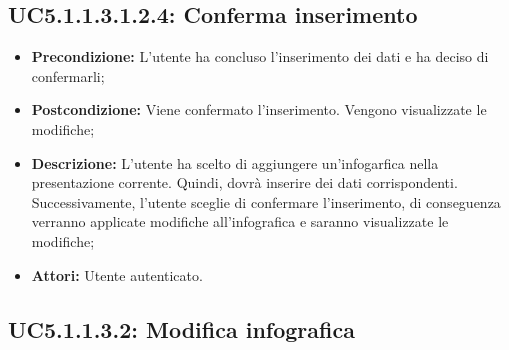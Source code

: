 \subsection{ UC5.1.1.3.1.2.4: Conferma inserimento}

\begin{itemize}
	\item \textbf{Precondizione:} L'utente ha concluso l'inserimento dei dati e ha deciso di confermarli;
	\item \textbf{Postcondizione:} Viene confermato l'inserimento. Vengono visualizzate le modifiche;
	\item \textbf{Descrizione:} L'utente ha scelto di aggiungere un'infogarfica nella presentazione corrente. Quindi, dovrà inserire dei dati corrispondenti. Successivamente, l'utente sceglie di confermare l'inserimento, di conseguenza verranno applicate modifiche all'infografica e saranno visualizzate le modifiche;
	\item \textbf{Attori:} Utente autenticato.
\end{itemize}
\subsection{ UC5.1.1.3.2: Modifica infografica}

